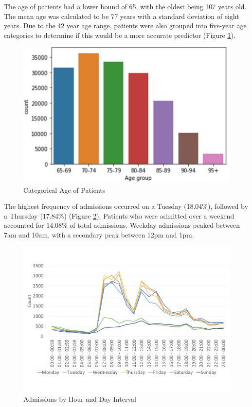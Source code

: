\documentclass[../thesis.tex]{subfiles}
\begin{document}
The age of patients had a lower bound of 65, with the oldest being 107 years old. The mean age was calculated to be 77 years with a standard deviation of eight years. Due to the 42 year age range, patients were also grouped into five-year age categories to determine if this would be a more accurate predictor (Figure \ref{fig:AgeGroup}). 

\begin{figure}[h!]
    \centering
    \includegraphics[scale=0.6]{Chapters/Chapter5/Figures/Age group.pdf}
    \caption{Categorical Age of Patients}
    \label{fig:AgeGroup}
\end{figure}

The highest frequency of admissions occurred on a Tuesday (18.04\%), followed by a Thursday (17.84\%) (Figure \ref{fig:AdmissionTimes}). Patients who were admitted over a weekend accounted for 14.08\% of total admissions. Weekday admissions peaked between 7am and 10am, with a secondary peak between 12pm and 1pm.

\begin{figure}[h!]
    \centering
    \includegraphics[width=\textwidth]{Chapters/Chapter5/Figures/AdmissionTimes.pdf}
    \caption{Admissions by Hour and Day Interval}
    \label{fig:AdmissionTimes}
\end{figure}
\end{document}
